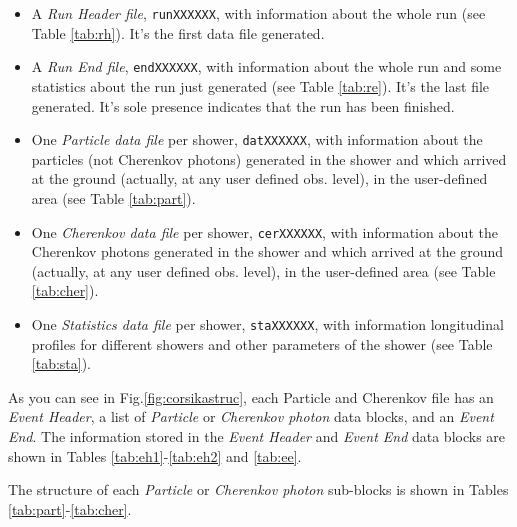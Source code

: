 \begin{itemize}
  
\item A \emph{Run Header file}, \texttt{runXXXXXX}, with information
  about the whole run (see Table \ref{tab:rh}). It's the first data
  file generated.
  
\item A \emph{Run End file}, \texttt{endXXXXXX}, with information
  about the whole run and some statistics about the run just generated
  (see Table \ref{tab:re}). It's the last file generated. It's sole
  presence indicates that the run has been finished.
  
\item One \emph{Particle data file} per shower, \texttt{datXXXXXX},
  with information about the particles (not Cherenkov photons)
  generated in the shower and which arrived at the ground (actually,
  at any user defined obs. level), in the user-defined area (see Table
  \ref{tab:part}).
  
\item One \emph{Cherenkov data file} per shower, \texttt{cerXXXXXX},
  with information about the Cherenkov photons generated in the shower
  and which arrived at the ground (actually, at any user defined obs.
  level), in the user-defined area (see Table \ref{tab:cher}).
  
\item One \emph{Statistics data file} per shower, \texttt{staXXXXXX},
  with information longitudinal profiles for different showers and
  other parameters of the shower (see Table \ref{tab:sta}).

\end{itemize}

As you can see in Fig.\ref{fig:corsikastruc}, each Particle and
Cherenkov file has an \emph{Event Header}, a list of \emph{Particle}
or \emph{Cherenkov photon} data blocks, and an \emph{Event End}. The
information stored in the \emph{Event Header} and \emph{Event End}
data blocks are shown in Tables \ref{tab:eh1}-\ref{tab:eh2} and
\ref{tab:ee}.

The structure of each \emph{Particle} or \emph{Cherenkov photon}
sub-blocks is shown in Tables \ref{tab:part}-\ref{tab:cher}.

\CORSIKAtableRH

\CORSIKAtableRH

\CORSIKAtableEHone

\CORSIKAtableEHtwo

\CORSIKAtableEE

